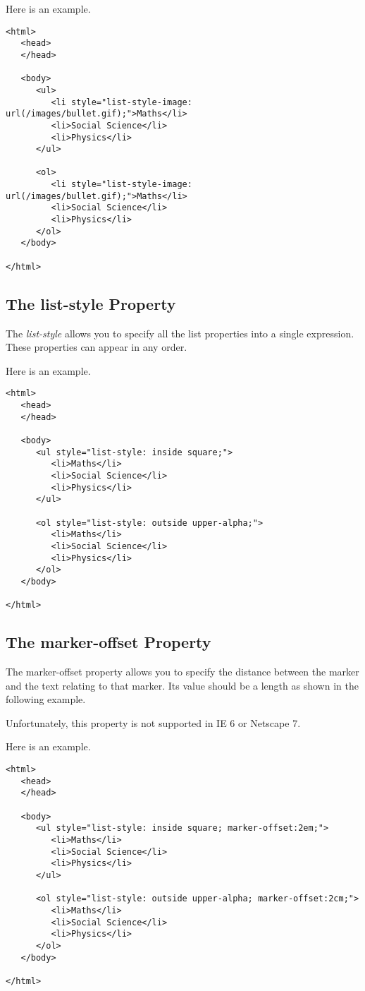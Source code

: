 \documentclass[a4paper,oneside]{book}
\numberwithin{equation}{chapter}
\begin{document}
Here is an example.
\begin{verbatim}
<html>
   <head>
   </head>
   
   <body>
      <ul>
         <li style="list-style-image: url(/images/bullet.gif);">Maths</li>
         <li>Social Science</li>
         <li>Physics</li>
      </ul>
      
      <ol>
         <li style="list-style-image: url(/images/bullet.gif);">Maths</li>
         <li>Social Science</li>
         <li>Physics</li>
      </ol>
   </body>
   
</html>
\end{verbatim}
\subsection{The list-style Property}
The \textit{list-style} allows you to specify all the list properties into a single expression. These properties can appear in any order.

Here is an example.
\begin{verbatim}
<html>
   <head>
   </head>
   
   <body>
      <ul style="list-style: inside square;">
         <li>Maths</li>
         <li>Social Science</li>
         <li>Physics</li>
      </ul>
      
      <ol style="list-style: outside upper-alpha;">
         <li>Maths</li>
         <li>Social Science</li>
         <li>Physics</li>
      </ol>
   </body>
   
</html> 
\end{verbatim}
\subsection{The marker-offset Property}
The marker-offset property allows you to specify the distance between the marker and the text relating to that marker. Its value should be a length as shown in the following example.

Unfortunately, this property is not supported in IE 6 or Netscape 7.

Here is an example.
\begin{verbatim}
<html>
   <head>
   </head>
   
   <body>
      <ul style="list-style: inside square; marker-offset:2em;">
         <li>Maths</li>
         <li>Social Science</li>
         <li>Physics</li>
      </ul>
      
      <ol style="list-style: outside upper-alpha; marker-offset:2cm;">
         <li>Maths</li>
         <li>Social Science</li>
         <li>Physics</li>
      </ol>
   </body>
   
</html>
\end{verbatim}
\end{document}
